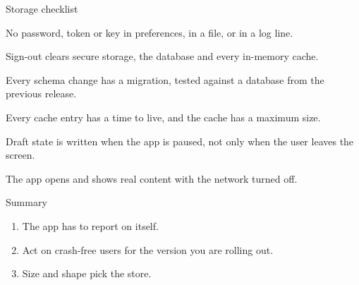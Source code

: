 \documentclass[10pt,aspectratio=169,t]{beamer}
\begin{document}
\begin{frame}[eyebrow=Lifecycle]{Storage checklist}
  \vskip 2mm
  \begin{checklist}
    \item No password, token or key in preferences, in a file, or in a log line.
    \item Sign-out clears secure storage, the database and every in-memory cache.
    \item Every schema change has a migration, tested against a database from the previous release.
    \item Every cache entry has a time to live, and the cache has a maximum size.
    \item Draft state is written when the app is paused, not only when the user leaves the screen.
    \item The app opens and shows real content with the network turned off.
  \end{checklist}
  \vskip 2mm
\end{frame}

\begin{frame}[eyebrow=Recap]{Summary}
  \vskip 2mm
  \begin{enumerate}
    \item The app has to report on itself. 
    \item Act on crash-free users for the version you are rolling out. 
    \item Size and shape pick the store. 
  \end{enumerate}
\end{frame}
\end{document}

